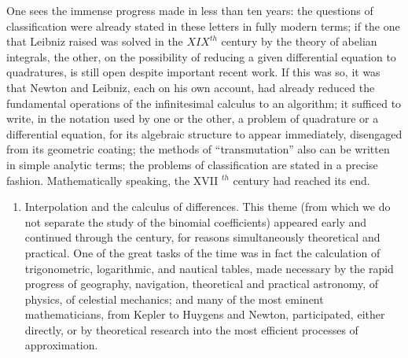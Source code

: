 One sees the immense progress made in less than ten years: the questions of classification were already stated in these letters in fully modern terms; if the one that Leibniz raised was solved in the \(XIX^{th}\) century by the theory of abelian integrals, the other, on the possibility of reducing a given differential equation to quadratures, is still open despite important recent work. If this was so, it was that Newton and Leibniz, each on his own account, had already reduced the fundamental operations of the infinitesimal calculus to an algorithm; it sufficed to write, in the notation used by one or the other, a problem of quadrature or a differential equation, for its algebraic structure to appear immediately, disengaged from its geometric coating; the methods of ``transmutation'' also can be written in simple analytic terms; the problems of classification are stated in a precise fashion. Mathematically speaking, the XVII \(^{th}\) century had reached its end.

\begin{enumerate}
\def\labelenumi{\Alph{enumi})}
\setcounter{enumi}{4}
\tightlist
\item
  Interpolation and the calculus of differences. This theme (from which we do not separate the study of the binomial coefficients) appeared early and continued through the century, for reasons simultaneously theoretical and practical. One of the great tasks of the time was in fact the calculation of trigonometric, logarithmic, and nautical tables, made necessary by the rapid progress of geography, navigation, theoretical and practical astronomy, of physics, of celestial mechanics; and many of the most eminent mathematicians, from Kepler to Huygens and Newton, participated, either directly, or by theoretical research into the most efficient processes of approximation.
\end{enumerate}

